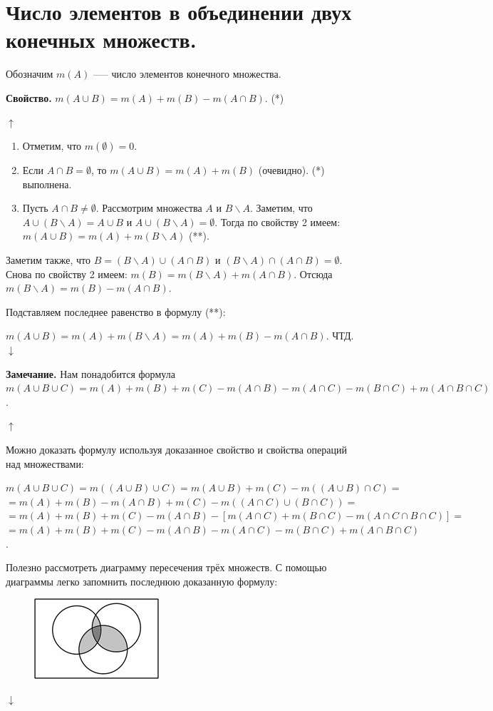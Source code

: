 \documentclass{article}
\begin{document}
    \section{Число элементов в объединении двух конечных множеств.}

    Обозначим $m(A)$ --— число элементов конечного множества.

    \textbf{Свойство.} $m(A \cup B) = m(A) + m(B) - m(A \cap B)$. (*) 

    $\uparrow$

    \begin{enumerate}
        \item Отметим, что $m(\emptyset) = 0$.
        \item Если $A \cap B = \emptyset$, то $m(A \cup B) = m(A) + m(B)$ (очевидно). (*) выполнена. 
        \item Пусть $A \cap B \neq \emptyset$. Рассмотрим множества $A$ и $B \backslash A$. Заметим, что $A \cup (B \backslash A) = A \cup B$ и $A \cup (B \backslash A) = \emptyset$. Тогда по свойству 2 имеем: $m(A \cup B) = m(A) + m(B \backslash A)$ (**).  
    \end{enumerate}
    
    Заметим также, что $B = (B \backslash A) \cup (A \cap B)$ и $(B \backslash A) \cap (A \cap B) = \emptyset$. Снова по свойству 2 имеем: $m(B) = m(B \backslash A) + m(A \cap B)$. Отсюда $m(B \backslash A) = m(B) - m(A \cap B)$.

    Подставляем последнее равенство в формулу (**):

    $m(A \cup B) = m(A) + m(B \backslash A) = m(A) + m(B) - m(A \cap B)$. ЧТД. $\downarrow$

    \textbf{Замечание.} Нам понадобится формула $m(A \cup B \cup C) = m(A) + m(B) + m(C) - m(A \cap B) - m(A \cap C) - m(B \cap C) + m(A \cap B \cap C)$. 

    $\uparrow$
    
    Можно доказать формулу используя доказанное свойство и свойства операций над множествами:

    $m(A \cup B \cup C) = m((A \cup B) \cup C) = m(A \cup B) + m(C) - m((A \cup B) \cap C) =$\\
    $= m(A) + m(B) - m(A \cap B) + m(C) - m((A \cap C) \cup (B \cap C)) =$\\ 
    $= m(A) + m(B) + m(C) - m(A \cap B) - [m(A \cap C) + m(B \cap C) - m(A \cap C \cap B \cap C)] =$\\
    $= m(A) + m(B) + m(C) - m(A \cap B) - m(A \cap C) - m(B \cap C) + m(A \cap B \cap C)$.
    
    Полезно рассмотреть диаграмму пересечения трёх множеств. С помощью диаграммы легко запомнить последнюю доказанную формулу:

    \begin{figure}[h!]
    \centering
    \includegraphics{3}
    \end{figure}

    $\downarrow$
\end{document}
